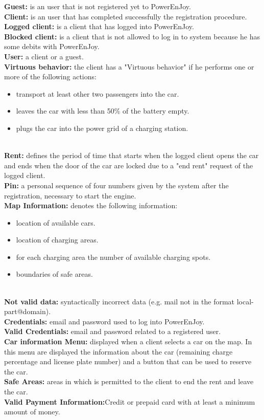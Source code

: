 \textbf{Guest:}
 is an user that is not registered yet to PowerEnJoy.\\
\textbf{Client:}
is an user that has completed successfully the registration procedure.\\
\textbf{Logged client:}
is a client that has logged into PowerEnJoy.\\
\textbf{Blocked client:}
is a client that is not allowed to log in to system because he has some debits with PowerEnJoy.\\
\textbf{User:}
a client or a guest.\\
\textbf{Virtuous  behavior:}
the client has a "Virtuous behavior" if he performs one or more of the following actions: 
\begin{itemize}
\item transport at least other two passengers into the car.
\item leaves the car with less than 50\% of the battery empty.
\item plugs the car into the power grid of a charging station.
\end{itemize}
\emph{\\}
\textbf{Rent:} defines the period of time that starts when the logged client opens the car and ends when the door of the car are locked due to a "end rent" request of the logged client.\\
\textbf{Pin:} a personal sequence of four numbers given by the system after the registration, necessary to start the engine.\\
\textbf{Map Information:}
denotes the following information: 
\begin{itemize}
\item location of available cars.
\item location of charging areas.
\item for each charging area the number of available charging spots.
\item boundaries of safe areas.
\end{itemize}
\emph{\\}
\textbf{Not valid data:}
syntactically incorrect data (e.g. mail not in the format local-part@domain).\\
\textbf{Credentials:}
email and password used to log into PowerEnJoy.\\
\textbf{Valid Credentials:}
email and password related to a registered user.\\
\textbf{Car information Menu:}
displayed when a client selects a car on the map. In this menu are displayed the information about the car (remaining charge percentage and license plate number) and a button that can be used to reserve the car.\\
\textbf{Safe Areas:} 
areas in which is permitted to the client to end the rent and leave the car.\\
\textbf{Valid Payment Information:}Credit or prepaid card with at least a minimum amount of money.\\

